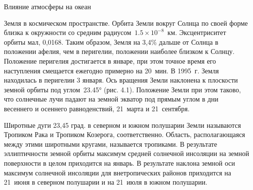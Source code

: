 \begin{chapter}{Влияние атмосферы на океан}
 
\begin{section}{Земля в космическом пространстве.}
Орбита Земли вокруг Солнца по своей форме близка к окружности со
средним радиусом~$1.5\times 10^{-8}$~км. Эксцентриситет орбиты мал,
0,0168. Таким образом, Земля на 3,4\% дальше от Солнца в положении
афелия, чем в перигелии, положении наиболее близком к
Солнцу. Положение перигелия достигается в январе, при этом точное
время его наступления смещается ежегодно примерно на 20~мин. В
1995~г. Земля находилась в перигелии 3 января. Ось вращения Земли
наклонена к плоскости земной орбиты под углом~23.45°
(рис. 4.1). Положение Земли при этом таково, что солнечные лучи падают
на земной экватор под прямым углом в дни весеннего и осеннего
равноденствий, 21~марта и 21~сентября.
%



Широтные дуги 23,45 град. в северном и южном полушарии Земли
называются Тропиком Рака и Тропиком Козерога, соответственно. Область,
располагающаяся между этими широтными кругами, называется тропиками. В
результате эллиптичности земной орбиты максимум средней солнечной
инсоляции на земной поверхности в целом приходится на январь. В
результате наклона земной оси максимум солнечной инсоляции для
внетропических районов приходится на 21~июня в северном полушарии и на
21~июля в южном полушарии.
%


\end{section}
\end{chapter}
